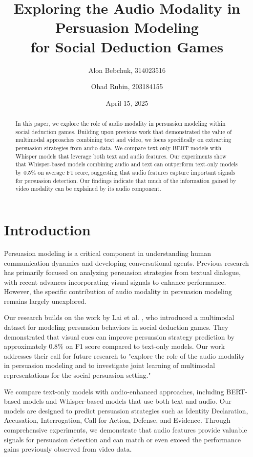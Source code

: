 \documentclass{article}
\title{Exploring the Audio Modality in Persuasion Modeling\\
for Social Deduction Games}
\author{Alon Bebchuk, 314023516 \and Ohad Rubin, 203184155}
\date{April 15, 2025}
\begin{document}
\maketitle

\begin{abstract}
In this paper, we explore the role of audio modality in persuasion modeling within social deduction games. Building upon previous work that demonstrated the value of multimodal approaches combining text and video, we focus specifically on extracting persuasion strategies from audio data. We compare text-only BERT models with Whisper models that leverage both text and audio features. Our experiments show that Whisper-based models combining audio and text can outperform text-only models by 0.5\% on average F1 score, suggesting that audio features capture important signals for persuasion detection. Our findings indicate that much of the information gained by video modality can be explained by its audio component.
\end{abstract}

\section{Introduction}
Persuasion modeling is a critical component in understanding human communication dynamics and developing conversational agents. Previous research has primarily focused on analyzing persuasion strategies from textual dialogue, with recent advances incorporating visual signals to enhance performance. However, the specific contribution of audio modality in persuasion modeling remains largely unexplored.

Our research builds on the work by Lai et al. \cite{lai2022werewolf}, who introduced a multimodal dataset for modeling persuasion behaviors in social deduction games. They demonstrated that visual cues can improve persuasion strategy prediction by approximately 0.8\% on F1 score compared to text-only models. Our work addresses their call for future research to "explore the role of the audio modality in persuasion modeling and to investigate joint learning of multimodal representations for the social persuasion setting."

We compare text-only models with audio-enhanced approaches, including BERT-based models and Whisper-based models that use both text and audio. Our models are designed to predict persuasion strategies such as Identity Declaration, Accusation, Interrogation, Call for Action, Defense, and Evidence. Through comprehensive experiments, we demonstrate that audio features provide valuable signals for persuasion detection and can match or even exceed the performance gains previously observed from video data.
\end{document}
